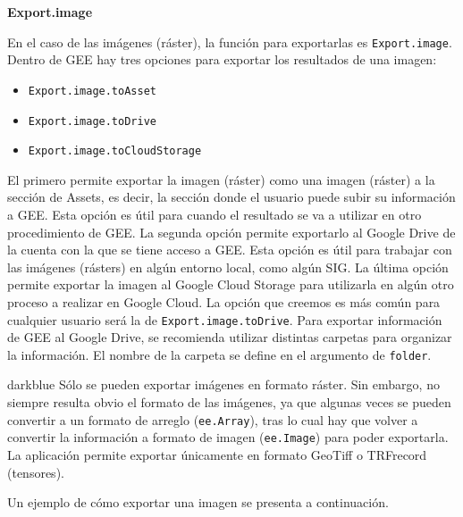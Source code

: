 \documentclass[
  12pt,
  letterpaper,
  twoside]{book}
\providecommand{\tightlist}{%
  \setlength{\itemsep}{0pt}\setlength{\parskip}{0pt}}
\begin{document}
\textbf{Export.image}

En el caso de las imágenes (ráster), la función para exportarlas es \texttt{Export.image}. Dentro de GEE hay tres opciones para exportar los resultados de una imagen:

\begin{itemize}
\tightlist
\item
  \texttt{Export.image.toAsset}
\item
  \texttt{Export.image.toDrive}
\item
  \texttt{Export.image.toCloudStorage}
\end{itemize}

El primero permite exportar la imagen (ráster) como una imagen (ráster) a la sección de Assets, es decir, la sección donde el usuario puede subir su información a GEE. Esta opción es útil para cuando el resultado se va a utilizar en otro procedimiento de GEE. La segunda opción permite exportarlo al Google Drive de la cuenta con la que se tiene acceso a GEE. Esta opción es útil para trabajar con las imágenes (rásters) en algún entorno local, como algún SIG. La última opción permite exportar la imagen al Google Cloud Storage para utilizarla en algún otro proceso a realizar en Google Cloud. La opción que creemos es más común para cualquier usuario será la de \texttt{Export.image.toDrive}. Para exportar información de GEE al Google Drive, se recomienda utilizar distintas carpetas para organizar la información. El nombre de la carpeta se define en el argumento de \texttt{folder}.

\begin{bluebox2}

\begin{awesomeblock}{5pt}{\faLightbulb}{darkblue}
Sólo se pueden exportar imágenes en formato ráster. Sin embargo, no siempre resulta obvio el formato de las imágenes, ya que algunas veces se pueden convertir a un formato de arreglo (\texttt{ee.Array}), tras lo cual hay que volver a convertir la información a formato de imagen (\texttt{ee.Image}) para poder exportarla. La aplicación permite exportar únicamente en formato GeoTiff o TRFrecord (tensores).

\end{awesomeblock}

\end{bluebox2}

Un ejemplo de cómo exportar una imagen se presenta a continuación.
\end{document}
